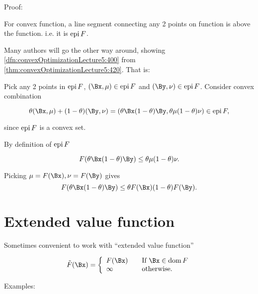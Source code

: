 
Proof:

For convex function, a line segment connecting any 2 points on function is above the function.  i.e. it is \( \operatorname{epi} F \).

Many authors will go the other way around, showing \cref{dfn:convexOptimizationLecture5:400} from \cref{thm:convexOptimizationLecture5:420}.  That is:

Pick any 2 points in \( \operatorname{epi} F \), \( (\Bx,\mu) \in \epi F\) and \( (\By, \nu) \in \epi F \).  Consider convex combination

\begin{equation}\label{eqn:convexOptimizationLecture5:420}
\theta( \Bx, \mu ) + (1-\theta) (\By, \nu) =
(\theta \Bx  (1-\theta) \By, \theta \mu  (1-\theta) \nu )
\in \epi F,
\end{equation}

since \( \operatorname{epi} F \) is a convex set.

By definition of \( \operatorname{epi} F \)

\begin{equation}\label{eqn:convexOptimizationLecture5:440}
F( \theta \Bx  (1-\theta) \By ) \le \theta \mu  (1-\theta) \nu.
\end{equation}

Picking \( \mu = F(\Bx), \nu = F(\By) \) gives
\begin{equation}\label{eqn:convexOptimizationLecture5:460}
F( \theta \Bx  (1-\theta) \By ) \le \theta F(\Bx)  (1-\theta) F(\By).
\end{equation}

\section{Extended value function}

Sometimes convenient to work with ``extended value function''

\begin{dmath}\label{eqn:convexOptimizationLecture5:500}
\tilde{F}(\Bx) =
\left\{
\begin{array}{l l}
F(\Bx) & \quad \mbox{If \( \Bx \in \dom F\)} \\
\infty & \quad \mbox{otherwise.}
\end{array}
\right.
\end{dmath}

Examples:

